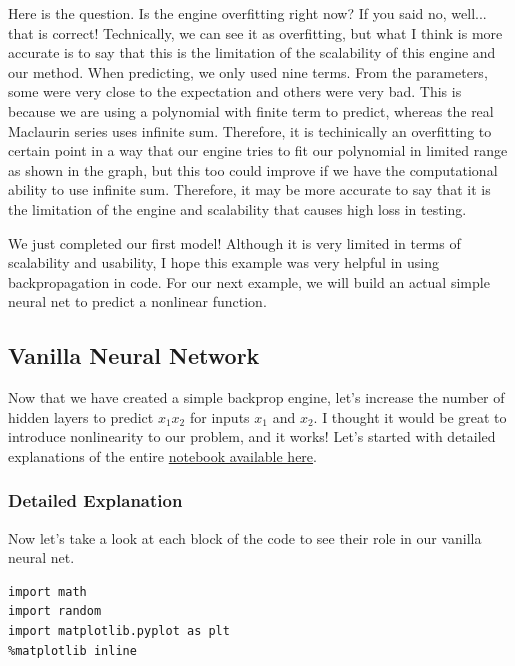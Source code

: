 \documentclass[../../../main.tex]{subfiles}
\begin{document}
Here is the question. Is the engine overfitting right now? If you
said no, well... that is correct! Technically, we can see it as
overfitting, but what I think is more accurate is to say that this
is the limitation of the scalability of this engine and our method.
When predicting, we only used nine terms. From the parameters,
some were very close to the expectation and others were very bad.
This is because we are using a polynomial with finite term to
predict, whereas the real Maclaurin series uses infinite sum.
Therefore, it is techinically an overfitting to certain point in
a way that our engine tries to fit our polynomial in limited range
as shown in the graph, but this too could improve if we have the
computational ability to use infinite sum. Therefore, it may be
more accurate to say that it is the limitation of the engine and
scalability that causes high loss in testing.

We just completed our first model! Although it is very limited
in terms of scalability and usability, I hope this example was
very helpful in using backpropagation in code. For our next
example, we will build an actual simple neural net to predict
a nonlinear function.

\subsection{Vanilla Neural Network}

Now that we have created a simple backprop engine, let's increase
the number of hidden layers to predict $x_1 x_2$ for inputs $x_1$
and $x_2$. I thought it would be great to introduce nonlinearity
to our problem, and it works! Let's started with detailed explanations
of the entire \href{https://github.com/enochness/LibreNotebook/blob/main/assets/src/CS01/26dmyng-2.ipynb}{notebook available here}.

\subsubsection{Detailed Explanation}

Now let's take a look at each block of the code to see their role
in our vanilla neural net.

\begin{jupyter}
\begin{lstlisting}[style=jin]
import math
import random
import matplotlib.pyplot as plt
%matplotlib inline
\end{lstlisting}
\begin{lstlisting}[style=jout]
\end{lstlisting}
\end{jupyter}
\end{document}
